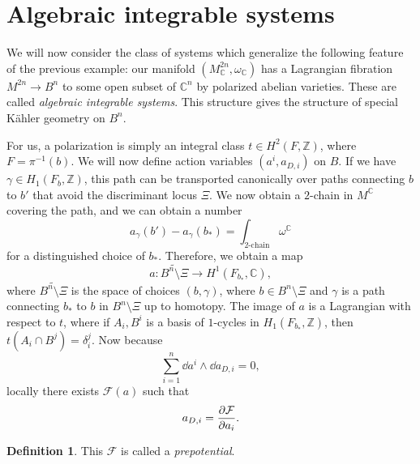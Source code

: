 \documentclass[leqno, openany]{memoir}
\theoremstyle{definition}
\newtheorem{defn}[thm]{Definition}
\theoremstyle{remark}
\theoremstyle{plain}
\theoremstyle{definition}
\theoremstyle{remark}
\newcommand{\C}{\mathbb{C}}
\newcommand{\Z}{\mathbb{Z}}
\newcommand{\mc}[1]{\mathcal{#1}}
\newcommand{\wt}[1]{\widetilde{#1}}
\begin{document}
\section{Algebraic integrable systems}
\label{sec:algebraic}

We will now consider the class of systems which generalize the following feature of the previous example: our manifold $(M^{2n}_{\C}, \omega_\C)$ has a Lagrangian fibration $M^{2n} \to B^n$ to some open subset of $\C^n$ by polarized abelian varieties. These are called \textit{algebraic integrable systems}. This structure gives the structure of special K\"ahler geometry on $B^n$.

For us, a polarization is simply an integral class $t \in H^2(F, \Z)$, where $F = \pi^{-1}(b)$. We will now define action variables $(a^i, a_{D,i})$ on $B$. If we have $\gamma \in H_1(F_b, \Z)$, this path can be transported canonically over paths connecting $b$ to $b'$ that avoid the discriminant locus $\Xi$. We now obtain a $2$-chain in $M^{\C}$ covering the path, and we can obtain a number
\[ a_{\gamma}(b') - a_{\gamma}(b_*) = \int_{\text{$2$-chain}} \omega^{\C} \]
for a distinguished choice of $b_*$. Therefore, we obtain a map
\[ a \colon \wt{B^n \setminus \Xi} \to H^1(F_{b_*}, \C), \]
where $\wt{B^n \setminus \Xi}$ is the space of choices $(b, \gamma)$, where $b \in B^n \setminus \Xi$ and $\gamma$ is a path connecting $b_*$ to $b$ in $B^n \setminus \Xi$ up to homotopy. The image of $a$ is a Lagrangian with respect to $t$, where if $A_i, B^i$ is a basis of $1$-cycles in $H_1(F_{b_*}, \Z)$, then $t(A_i \cap B^j) = \delta_i^j$. Now because
\[ \sum_{i=1}^n \dd{a^i} \wedge \dd{a_{D,i}} = 0, \]
locally there exists $\mc{F}(a)$ such that
\[ a_{D,i} = \pdv{\mc{F}}{a_i}. \]

\begin{defn}
This $\mc{F}$ is called a \textit{prepotential}.
\end{defn}
\end{document}
